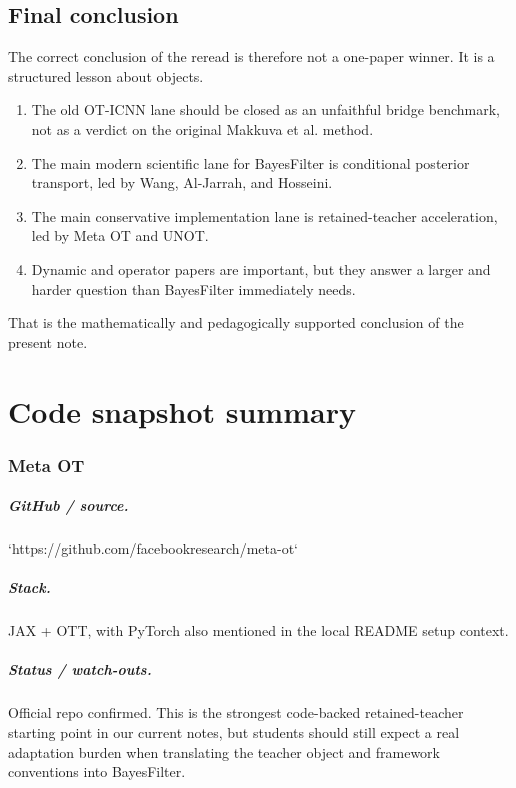 \documentclass[11pt]{report}
\begin{document}
\section{Final conclusion}

The correct conclusion of the reread is therefore not a one-paper winner.  It is a
structured lesson about objects.

\begin{enumerate}[label=(\arabic*)]
  \item The old OT-ICNN lane should be closed as an unfaithful bridge benchmark,
  not as a verdict on the original Makkuva et al. method.
  \item The main modern scientific lane for BayesFilter is conditional posterior
  transport, led by Wang, Al-Jarrah, and Hosseini.
  \item The main conservative implementation lane is retained-teacher
  acceleration, led by Meta OT and UNOT.
  \item Dynamic and operator papers are important, but they answer a larger and
  harder question than BayesFilter immediately needs.
\end{enumerate}

That is the mathematically and pedagogically supported conclusion of the present
note.

\chapter*{Code snapshot summary}

\subsection*{Meta OT}
\paragraph{GitHub / source.}
`https://github.com/facebookresearch/meta-ot`

\paragraph{Stack.}
JAX + OTT, with PyTorch also mentioned in the local README setup context.

\paragraph{Status / watch-outs.}
Official repo confirmed.  This is the strongest code-backed retained-teacher
starting point in our current notes, but students should still expect a real
adaptation burden when translating the teacher object and framework conventions
into BayesFilter.
\end{document}
